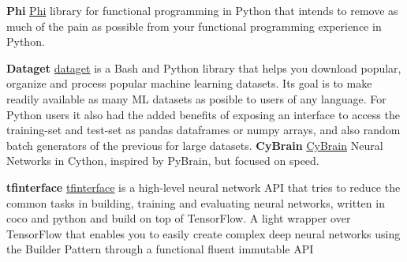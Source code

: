 \begin{cventries}
  \cventry
    {\textbf{Phi}}
    {}
    {}
    {}
    {
      \href{https://github.com/cgarciae/phi}{Phi} library for functional programming in Python that intends to remove as much of the pain as possible from your functional programming experience in Python.
    }

  \cventry
    {\textbf{Dataget}}
    {}
    {}
    {}
    {
    \href{https://github.com/cgarciae/dataget}{dataget}  is a Bash and Python library that helps you download popular, organize and process popular machine learning datasets. Its goal is to make readily available as many ML datasets as posible to users of any language. For Python users it also had the added benefits of exposing an interface to access the training-set and test-set as pandas dataframes or numpy arrays, and also random batch generators of the previous for large datasets.
    }
  \cventry
    {\textbf{CyBrain}}
    {}
    {}
    {}
    {
    \href{https://github.com/cgarciae/cybrain}{CyBrain} Neural Networks in Cython, inspired by PyBrain, but focused on speed.
    }

  \cventry
    {\textbf{tfinterface}}
    {}
    {}
    {}
    {
    \href{https://github.com/cgarciae/tfinterface}{tfinterface} is a high-level neural network API that tries to reduce the common tasks in building, training and evaluating neural networks, written in coco and python and build on top of TensorFlow. A light wrapper over TensorFlow that enables you to easily create complex deep neural networks using the Builder Pattern through a functional fluent immutable API
    }
\end{cventries}
